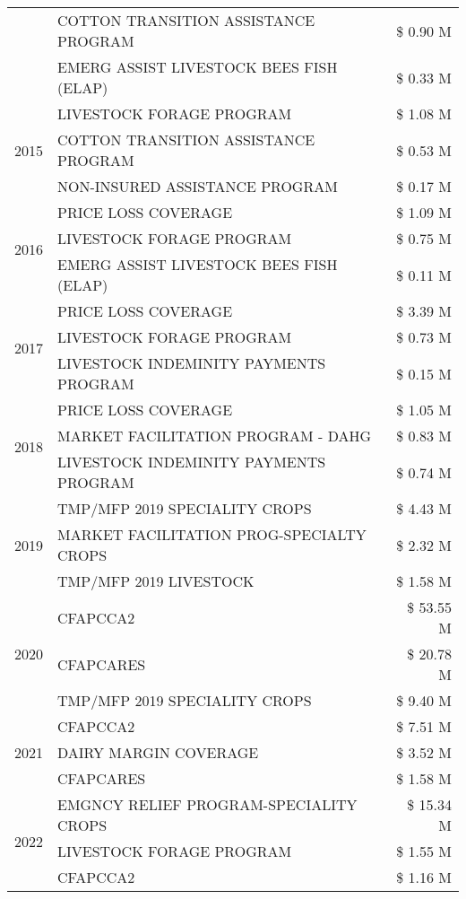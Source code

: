 \begin{tabular}{llr}
 & COTTON TRANSITION ASSISTANCE PROGRAM & \$ 0.90 M \\
 & EMERG ASSIST LIVESTOCK BEES FISH (ELAP) & \$ 0.33 M \\
\cline{1-3}
\multirow[t]{3}{*}{2015} & LIVESTOCK FORAGE PROGRAM & \$ 1.08 M \\
 & COTTON TRANSITION ASSISTANCE PROGRAM & \$ 0.53 M \\
 & NON-INSURED ASSISTANCE PROGRAM & \$ 0.17 M \\
\cline{1-3}
\multirow[t]{3}{*}{2016} & PRICE LOSS COVERAGE & \$ 1.09 M \\
 & LIVESTOCK FORAGE PROGRAM & \$ 0.75 M \\
 & EMERG ASSIST LIVESTOCK BEES FISH (ELAP) & \$ 0.11 M \\
\cline{1-3}
\multirow[t]{3}{*}{2017} & PRICE LOSS COVERAGE & \$ 3.39 M \\
 & LIVESTOCK FORAGE PROGRAM & \$ 0.73 M \\
 & LIVESTOCK INDEMINITY PAYMENTS PROGRAM & \$ 0.15 M \\
\cline{1-3}
\multirow[t]{3}{*}{2018} & PRICE LOSS COVERAGE & \$ 1.05 M \\
 & MARKET FACILITATION PROGRAM - DAHG & \$ 0.83 M \\
 & LIVESTOCK INDEMINITY PAYMENTS PROGRAM & \$ 0.74 M \\
\cline{1-3}
\multirow[t]{3}{*}{2019} & TMP/MFP 2019 SPECIALITY CROPS & \$ 4.43 M \\
 & MARKET FACILITATION PROG-SPECIALTY CROPS & \$ 2.32 M \\
 & TMP/MFP 2019 LIVESTOCK & \$ 1.58 M \\
\cline{1-3}
\multirow[t]{3}{*}{2020} & CFAPCCA2 & \$ 53.55 M \\
 & CFAPCARES & \$ 20.78 M \\
 & TMP/MFP 2019 SPECIALITY CROPS & \$ 9.40 M \\
\cline{1-3}
\multirow[t]{3}{*}{2021} & CFAPCCA2 & \$ 7.51 M \\
 & DAIRY MARGIN COVERAGE & \$ 3.52 M \\
 & CFAPCARES & \$ 1.58 M \\
\cline{1-3}
\multirow[t]{3}{*}{2022} & EMGNCY RELIEF PROGRAM-SPECIALITY CROPS & \$ 15.34 M \\
 & LIVESTOCK FORAGE PROGRAM & \$ 1.55 M \\
 & CFAPCCA2 & \$ 1.16 M \\
\cline{1-3}
\bottomrule
\end{tabular}
